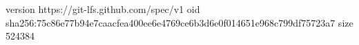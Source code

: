 version https://git-lfs.github.com/spec/v1
oid sha256:75c86e77b94e7caacfea400ee6e4769ce6b3d6e0f014651e968c799df75723a7
size 524384
